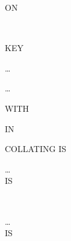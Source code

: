 \begin{syntax}
   \identifier
  \begin{0-1}
    ON
    \begin{1=}
       \\
    \end{1=}
    KEY
    \begin{0-1}
      \identifier
    \end{0-1}\ldots
  \end{0-1} \ldots

  \begin{0-1}
    WITH 
    \begin{0-1}
      IN 
    \end{0-1}
  \end{0-1}

  \begin{0-1}
    COLLATING  IS \identifier
  \end{0-1}

  \begin{0-1}
    \begin{1=}
      \filename
    \end{1=}\ldots \\

      IS
    \procedurename
    \begin{0-1}
      \begin{1=}
         \\
      \end{1=}
      \procedurename
    \end{0-1}
  \end{0-1}

  \begin{0-1}
    \begin{1=}
      \filename
    \end{1=}\ldots \\

      IS
    \procedurename
    \begin{0-1}
      \begin{1=}
         \\
      \end{1=}
      \procedurename
    \end{0-1}
  \end{0-1}
\end{syntax}

